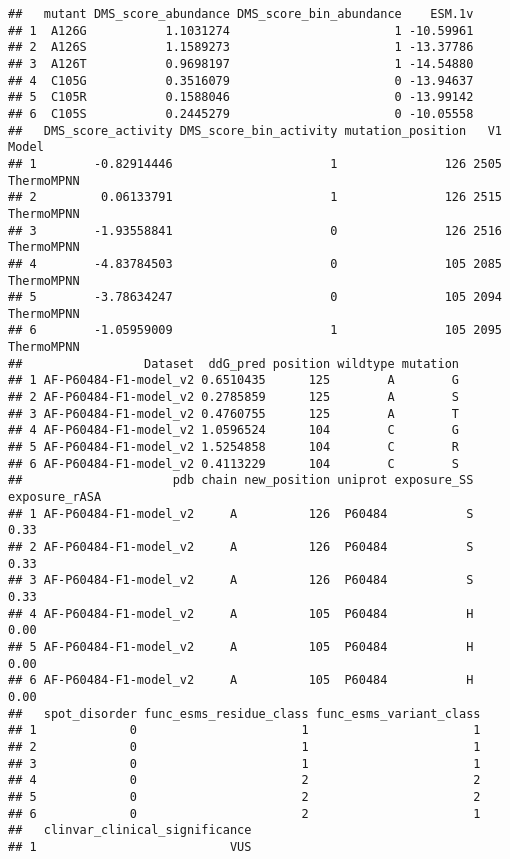 \documentclass[
]{article}
\begin{document}
\begin{verbatim}
##   mutant DMS_score_abundance DMS_score_bin_abundance    ESM.1v
## 1  A126G           1.1031274                       1 -10.59961
## 2  A126S           1.1589273                       1 -13.37786
## 3  A126T           0.9698197                       1 -14.54880
## 4  C105G           0.3516079                       0 -13.94637
## 5  C105R           0.1588046                       0 -13.99142
## 6  C105S           0.2445279                       0 -10.05558
##   DMS_score_activity DMS_score_bin_activity mutation_position   V1      Model
## 1        -0.82914446                      1               126 2505 ThermoMPNN
## 2         0.06133791                      1               126 2515 ThermoMPNN
## 3        -1.93558841                      0               126 2516 ThermoMPNN
## 4        -4.83784503                      0               105 2085 ThermoMPNN
## 5        -3.78634247                      0               105 2094 ThermoMPNN
## 6        -1.05959009                      1               105 2095 ThermoMPNN
##                 Dataset  ddG_pred position wildtype mutation
## 1 AF-P60484-F1-model_v2 0.6510435      125        A        G
## 2 AF-P60484-F1-model_v2 0.2785859      125        A        S
## 3 AF-P60484-F1-model_v2 0.4760755      125        A        T
## 4 AF-P60484-F1-model_v2 1.0596524      104        C        G
## 5 AF-P60484-F1-model_v2 1.5254858      104        C        R
## 6 AF-P60484-F1-model_v2 0.4113229      104        C        S
##                     pdb chain new_position uniprot exposure_SS exposure_rASA
## 1 AF-P60484-F1-model_v2     A          126  P60484           S          0.33
## 2 AF-P60484-F1-model_v2     A          126  P60484           S          0.33
## 3 AF-P60484-F1-model_v2     A          126  P60484           S          0.33
## 4 AF-P60484-F1-model_v2     A          105  P60484           H          0.00
## 5 AF-P60484-F1-model_v2     A          105  P60484           H          0.00
## 6 AF-P60484-F1-model_v2     A          105  P60484           H          0.00
##   spot_disorder func_esms_residue_class func_esms_variant_class
## 1             0                       1                       1
## 2             0                       1                       1
## 3             0                       1                       1
## 4             0                       2                       2
## 5             0                       2                       2
## 6             0                       2                       1
##   clinvar_clinical_significance
## 1                           VUS

\end{verbatim}
\end{document}
